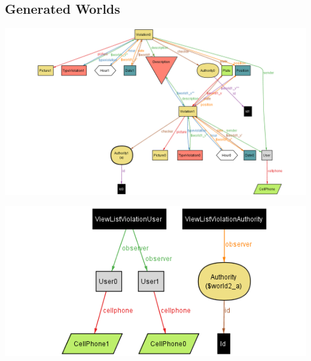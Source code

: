 

\newpage

\subsection{Generated Worlds}



\vspace{0.5cm}

\includegraphics{Images/AlloyWorlds/World1.png}

\vspace{1cm}



\vspace{0.5cm}

\includegraphics[width=\textwidth]{Images/AlloyWorlds/World2.png}

\newpage



\vspace{0.5cm}

